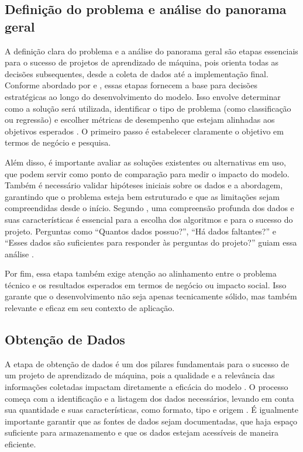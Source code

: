 \subsection{Definição do problema e análise do panorama geral}
A definição clara do problema e a análise do panorama geral são etapas essenciais para o sucesso de projetos de aprendizado de máquina, pois orienta todas as decisões subsequentes, desde a coleta de dados até a implementação final. Conforme abordado por  e , essas etapas fornecem a base para decisões estratégicas ao longo do desenvolvimento do modelo.  Isso envolve determinar como a solução será utilizada, identificar o tipo de problema (como classificação ou regressão) e escolher métricas de desempenho que estejam alinhadas aos objetivos esperados \cite{geron2017}. O primeiro passo é estabelecer claramente o objetivo em termos de negócio e pesquisa. 

Além disso, é importante avaliar as soluções existentes ou alternativas em uso, que podem servir como ponto de comparação para medir o impacto do modelo. Também é necessário validar hipóteses iniciais sobre os dados e a abordagem, garantindo que o problema esteja bem estruturado e que as limitações sejam compreendidas desde o início. Segundo , uma compreensão profunda dos dados e suas características é essencial para a escolha dos algoritmos e para o sucesso do projeto. Perguntas como “Quantos dados possuo?”, “Há dados faltantes?” e “Esses dados são suficientes para responder às perguntas do projeto?” guiam essa análise \cite{muller2017}.

Por fim, essa etapa também exige atenção ao alinhamento entre o problema técnico e os resultados esperados em termos de negócio ou impacto social. Isso garante que o desenvolvimento não seja apenas tecnicamente sólido, mas também relevante e eficaz em seu contexto de aplicação.

\subsection{Obtenção de Dados}
A etapa de obtenção de dados é um dos pilares fundamentais para o sucesso de um projeto de aprendizado de máquina, pois a qualidade e a relevância das informações coletadas impactam diretamente a eficácia do modelo \cite{geron2017}. O processo começa com a identificação e a listagem dos dados necessários, levando em conta sua quantidade e suas características, como formato, tipo e origem \cite{geron2017}. É igualmente importante garantir que as fontes de dados sejam documentadas, que haja espaço suficiente para armazenamento e que os dados estejam acessíveis de maneira eficiente.

